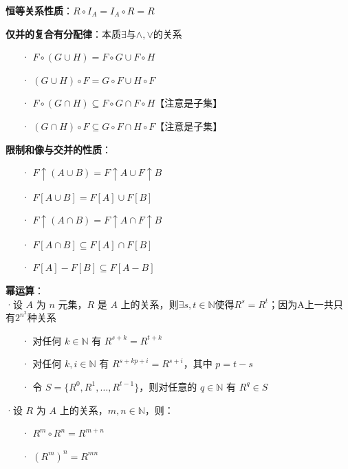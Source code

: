 	\textbf{恒等关系性质}：$R \circ I_A = I_A \circ R = R$
	
	\textbf{仅并的复合有分配律}：本质$\exists$与$\land, \lor$的关系
	\begin{itemize}
		\item[·] $F \circ (G \cup H) = F \circ G \cup F \circ H$
		\item[·] $(G \cup H) \circ F = G \circ F \cup H \circ F$
		\item[·] $F \circ (G \cap H) \subseteq F \circ G \cap F \circ H$【注意是子集】
		\item[·] $(G \cap H) \circ F \subseteq G \circ F \cap H \circ F$【注意是子集】
	\end{itemize}
	
	\textbf{限制和像与交并的性质}：
	\begin{itemize}
		\item[·] $F \uparrow (A \cup B) = F \uparrow A \cup F \uparrow B$
		\item[·] $F[A \cup B] = F[A] \cup F[B]$
		\item[·] $F \uparrow (A \cap B) = F \uparrow A \cap F \uparrow B$
		\item[·] $F[A \cap B] \subseteq F[A] \cap F[B]$
		\item[·] $F[A] - F[B] \subseteq F[A - B]$
	\end{itemize}
	
	\textbf{幂运算}：\\
	·设 $A$ 为 $n$ 元集，$R$ 是 $A$ 上的关系，则$\exists s,t\in \mathbb{N} \text{使得}R^s = R^t$；因为A上一共只有$2^{n^2}$种关系
	\begin{itemize}
		\item[·] 对任何 $k \in \mathbb{N}$ 有 $R^{s+k} = R^{t+k}$
		\item[·] 对任何 $k, i \in \mathbb{N}$ 有 $R^{s + kp + i} = R^{s + i}$，其中 $p = t - s$
		\item[·] 令 $S = \{R^0, R^1, \ldots, R^{t-1}\}$，则对任意的 $q \in \mathbb{N}$ 有 $R^q \in S$
	\end{itemize}
	
	·设 $R$ 为 $A$ 上的关系，$m, n \in \mathbb{N}$，则：
	\begin{itemize}
		\item[·] $R^m \circ R^n = R^{m+n}$
		\item[·] $(R^m)^n = R^{mn}$
	\end{itemize}
		
